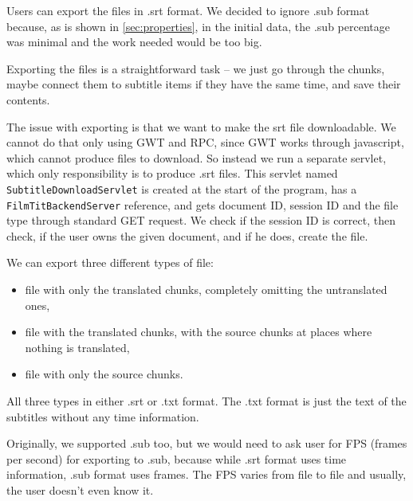 Users can export the files in .srt format. We decided to ignore .sub format because, as is shown in \ref{sec:properties}, in the initial data, the .sub percentage was minimal and the work needed would be too big.

Exporting the files is a straightforward task -- we just go through the chunks, maybe connect them to subtitle items if they have the same time, and save their contents.



The issue with exporting is that we want to make the srt file downloadable. We cannot do that only using GWT and RPC, since GWT works through javascript, which cannot produce files to download. So instead we run a separate servlet, which only responsibility is to produce .srt files. This servlet named \texttt{SubtitleDownloadServlet} is created at the start of the program, has a \texttt{FilmTitBackendServer} reference, and gets document ID, session ID and the file type through standard GET request. We check if the session ID is correct, then check, if the user owns the given document, and if he does, create the file.

We can export three different types of file:
\begin{itemize}
    \item file with only the translated chunks, completely omitting the untranslated ones,
    \item file with the translated chunks, with the source chunks at places where nothing is translated,
    \item file with only the source chunks.
\end{itemize}
All three types in either .srt or .txt format. The .txt format is just the text of the subtitles without any time information.

Originally, we supported .sub too, but we would need to ask user for FPS (frames per second) for exporting to .sub, because while .srt format uses time information, .sub format uses frames. The FPS varies from file to file and usually, the user doesn't even know it.
